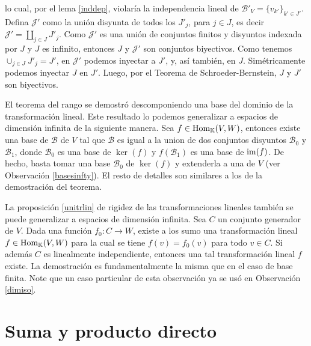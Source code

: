 \begin{obs}
lo cual, por el lema \ref{inddep}, violar\'ia la independencia lineal de $\mathcal{B}'_V=\{v_{k'}\}_{k'\in J'}$. Defina $\mathcal{J}'$ como la uni\'on disyunta de todos los $J'_j$, para $j\in J$, es decir $\mathcal{J}'=\coprod_{j\in J} J'_j$.
Como $\mathcal{J}'$ es una uni\'on de conjuntos finitos y disyuntos indexada por $J$ y $J$ es infinito, entonces $J$ y $\mathcal{J}'$ son conjuntos biyectivos. Como tenemos $\cup_{j\in J}J'_j=J'$, en $\mathcal{J}'$ podemos inyectar a $J'$, y, as\'i tambi\'en, en $J$. Sim\'etricamente podemos inyectar $J$ en $J'$. Luego, por el Teorema de Schroeder-Bernstein, $J$ y $J'$ son biyectivos.
\end{obs}

\begin{obs}
El teorema del rango se demostr\'o descomponiendo una base del dominio de la transformaci\'on lineal. Este resultado lo podemos generalizar a espacios de dimensi\'on infinita de la siguiente manera. Sea $f\in\operatorname{Hom}_{\mathbb{K}}(V,W)$, entonces existe una base de $\mathcal{B}$ de $V$ tal que $\mathcal{B}$ es igual a la union de dos conjuntos disyuntos $\mathcal{B}_0$ y $ \mathcal{B}_1$, donde $\mathcal{B}_0$ es una base de $\ker(f)$ y $f\left(\mathcal{B}_1\right)$ es una base de $\operatorname{im}(f)$. De hecho, basta tomar una base $\mathcal{B}_0$ de $\ker(f)$ y extenderla a una de $V$ (ver Observaci\'on \ref{basesinfty}). El resto de detalles son similares a los de la demostraci\'on del teorema.
\end{obs}

\begin{obs}\label{unitrlinealinfty}
La proposici\'on \ref{unitrlin} de rigidez de las transformaciones lineales tambi\'en se puede generalizar a espacios de dimensi\'on infinita. Sea $C$ un conjunto generador de $V$. Dada una funci\'on $f_0: C\rightarrow W$, existe a los sumo una transformaci\'on lineal $f\in\operatorname{Hom}_{\mathbb{K}}(V,W)$ para la cual se tiene $f(v)=f_0(v)$ para todo $v\in C$. Si adem\'as $C$ es linealmente independiente, entonces una tal transformaci\'on lineal $f$ existe. La demostraci\'on es fundamentalmente la misma que en el caso de base finita. Note que un caso particular de esta observaci\'on ya se us\'o en Observaci\'on \ref{dimiso}.
\end{obs}

\section{Suma y producto directo}


